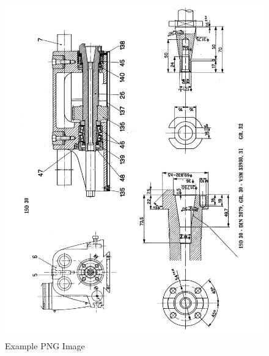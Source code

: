 \newpage
\begin{figure}[h]
    \centering
    \includegraphics[width=1.0\linewidth]{images/page_23}
    \caption{Example PNG Image}
    \label{fig:horizontal_spindle_dimensions_2}
\end{figure}
